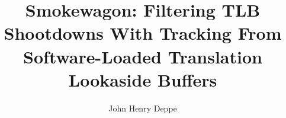 \documentclass[gpscopy,onehalfspacing,11pt]{ubcdiss}
\title{Smokewagon: Filtering TLB Shootdowns With Tracking From Software-Loaded Translation Lookaside Buffers}
\author{John Henry Deppe}
\begin{document}

\maketitle

\makecommitteepage


\cleardoublepage


\cleardoublepage


\cleardoublepage

\tableofcontents
\cleardoublepage	%

\listoftables
\cleardoublepage	%

\listoffigures
\cleardoublepage	%



\textspacing		%




\mainmatter

\acresetall	%




%


%
\end{document}
